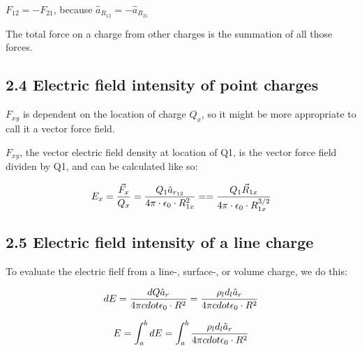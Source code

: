 \documentclass[12pt]{extarticle} %
\begin{document}
$F_{12} = - F_{21}$, because $\hat{a}_{R_{12}} = - \hat{a}_{R_{21}}$

The total force on a charge from other charges is the summation of all those forces.

\subsection*{2.4 Electric field intensity of point charges}

$F_{xy}$ is dependent on the location of charge $Q_x$, so it might be more appropriate to call it a vector force field.

$F_{xy}$, the vector electric field density at location of Q1, is the vector force field dividen by Q1, and can be calculated like so:

$$
E_x = {\vec{F}_x \over Q_x} = {Q_1 \hat{a}_{r_{12}} \over 4 \pi \cdot \epsilon_0 \cdot R_{1x}^2}
= = {Q_1 \vec{R}_{1x} \over 4 \pi \cdot \epsilon_0 \cdot R_{1x}^{3/2}}
$$

\subsection*{2.5 Electric field intensity of a line charge}
To evaluate the electric fielf from a line-, surface-, or volume charge, we do this:

$$
dE = {dQ \hat{a}_r \over 4 \pi cdot \epsilon_0 \cdot R^2} =
{ \rho_l d_l \hat{a}_r \over 4 \pi cdot \epsilon_0 \cdot R^2}
$$

$$
E = \int_a^bdE = \int_a^b { \rho_l d_l \hat{a}_r \over 4 \pi cdot \epsilon_0 \cdot R^2}
$$
\end{document}
